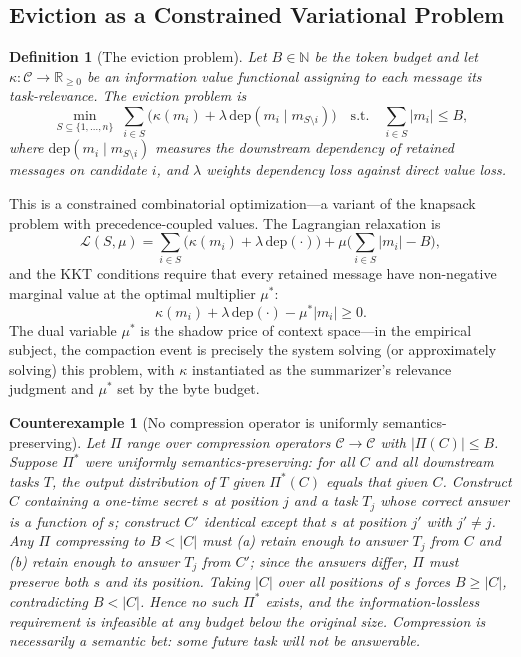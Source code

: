 \documentclass[11pt]{article}
\newtheorem{definition}[theorem]{Definition}
\newtheorem{counterexample}[theorem]{Counterexample}
\begin{document}
\subsection{Eviction as a Constrained Variational Problem}

\begin{definition}[The eviction problem]
Let $B \in \mathbb{N}$ be the token budget and let
$\kappa : \mathcal{C} \to \mathbb{R}_{\ge 0}$ be an information value
functional assigning to each message its task-relevance. The eviction problem
is
\[
\min_{S \subseteq \{1,\dots,n\}} \; \sum_{i \in S}
\big(\kappa(m_i) + \lambda\, \mathrm{dep}(m_i \mid m_{S \setminus i})\big)
\quad \text{s.t.} \quad \sum_{i \in S} |m_i| \le B,
\]
where $\mathrm{dep}(m_i \mid m_{S\setminus i})$ measures the downstream
dependency of retained messages on candidate $i$, and $\lambda$ weights
dependency loss against direct value loss.
\end{definition}

This is a constrained combinatorial optimization---a variant of the knapsack
problem with precedence-coupled values. The Lagrangian relaxation is
\[
\mathcal{L}(S, \mu) = \sum_{i \in S} \big(\kappa(m_i) + \lambda\,
\mathrm{dep}(\cdot)\big) + \mu \Big(\sum_{i \in S} |m_i| - B\Big),
\]
and the KKT conditions require that every retained message have non-negative
marginal value at the optimal multiplier $\mu^*$:
\[
\kappa(m_i) + \lambda\,\mathrm{dep}(\cdot) - \mu^* |m_i| \ge 0.
\]
The dual variable $\mu^*$ is the shadow price of context space---in the
empirical subject, the compaction event is precisely the system solving (or
approximately solving) this problem, with $\kappa$ instantiated as the
summarizer's relevance judgment and $\mu^*$ set by the byte budget.

\begin{counterexample}[No compression operator is uniformly
semantics-preserving]
Let $\Pi$ range over compression operators
$\mathcal{C} \to \mathcal{C}$ with $|\Pi(C)| \le B$. Suppose
$\Pi^*$ were uniformly semantics-preserving: for all $C$ and all downstream
tasks $T$, the output distribution of $T$ given $\Pi^*(C)$ equals that given
$C$. Construct $C$ containing a one-time secret $s$ at position $j$ and a
task $T_j$ whose correct answer is a function of $s$; construct $C'$
identical except that $s$ at position $j'$ with $j' \neq j$. Any $\Pi$
compressing to $B < |C|$ must (a) retain enough to answer $T_j$ from $C$ and
(b) retain enough to answer $T_j$ from $C'$; since the answers differ,
$\Pi$ must preserve both $s$ and its position. Taking $|C|$ over all
positions of $s$ forces $B \ge |C|$, contradicting $B < |C|$. Hence no such
$\Pi^*$ exists, and the information-lossless requirement is infeasible at
any budget below the original size. \emph{Compression is necessarily a
semantic bet}: some future task will not be answerable.
\end{counterexample}
\end{document}
